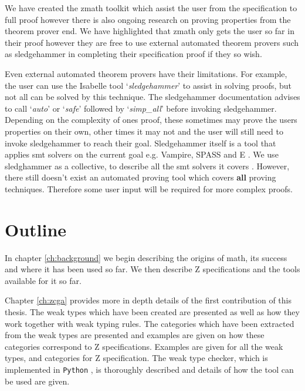 We have created the \Gls{zmath} toolkit which assist the user from the
specification to full proof however there is also ongoing research on proving
properties from the theorem prover end. We have highlighted that
\gls{zmath} only gets the user so far in their proof however they are free to
use external automated theorem provers such as sledgehammer in completing their specification proof
if they so wish.

Even external automated theorem provers have their limitations. For example, the
user can use the Isabelle tool `\emph{sledgehammer}' to assist in solving
proofs, but not all can be solved by this technique. The sledgehammer
documentation advises to call `\emph{auto}' or `\emph{safe}' followed by
`\emph{simp\_all}' before invoking sledgehammer. Depending on the complexity of
ones proof, these sometimes may prove the users properties on their own, other
times it may not and the user will still need to invoke sledgehammer to reach
their goal. Sledgehammer itself is a tool that applies \gls{smt} solvers on the
current goal e.g. Vampire\cite{vampire}, SPASS \cite{fmintrol} and E \cite{e}. We
use sledghammer as a collective, to describe all the \gls{smt} solvers it covers
\cite{sledgehammer}. However, there
still doesn't exist an automated proving tool which covers \textbf{all} proving
techniques. Therefore some user input will be required for more complex proofs.

\section{Outline}

In chapter \ref{ch:background} we begin describing the origins of \gls{math},
its success and where it has been used so far. We then describe Z specifications
and the tools available for it so far.


Chapter \ref{ch:zcga} provides more in depth details of the first contribution
of this thesis. The weak types which have been created are presented as well as
how they work together with weak typing rules. The categories which have been
extracted from the weak types are presented and examples are given on how these
categories correspond to Z specifications. Examples are given for all the weak
types, and categories for Z specification. The weak type checker, which is
implemented in \texttt{Python} \cite{Python}, is thoroughly described and
details of how the tool can be used are given.

